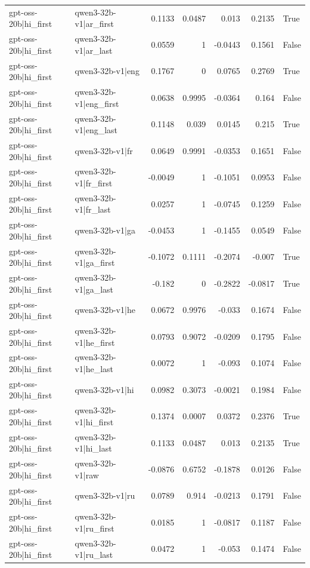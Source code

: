 \begin{table}
\begin{tabular}{l l r r r r l}
gpt-oss-20b|hi_first & qwen3-32b-v1|ar_first & 0.1133 & 0.0487 & 0.013 & 0.2135 & True \\
gpt-oss-20b|hi_first & qwen3-32b-v1|ar_last & 0.0559 & 1 & -0.0443 & 0.1561 & False \\
gpt-oss-20b|hi_first & qwen3-32b-v1|eng & 0.1767 & 0 & 0.0765 & 0.2769 & True \\
gpt-oss-20b|hi_first & qwen3-32b-v1|eng_first & 0.0638 & 0.9995 & -0.0364 & 0.164 & False \\
gpt-oss-20b|hi_first & qwen3-32b-v1|eng_last & 0.1148 & 0.039 & 0.0145 & 0.215 & True \\
gpt-oss-20b|hi_first & qwen3-32b-v1|fr & 0.0649 & 0.9991 & -0.0353 & 0.1651 & False \\
gpt-oss-20b|hi_first & qwen3-32b-v1|fr_first & -0.0049 & 1 & -0.1051 & 0.0953 & False \\
gpt-oss-20b|hi_first & qwen3-32b-v1|fr_last & 0.0257 & 1 & -0.0745 & 0.1259 & False \\
gpt-oss-20b|hi_first & qwen3-32b-v1|ga & -0.0453 & 1 & -0.1455 & 0.0549 & False \\
gpt-oss-20b|hi_first & qwen3-32b-v1|ga_first & -0.1072 & 0.1111 & -0.2074 & -0.007 & True \\
gpt-oss-20b|hi_first & qwen3-32b-v1|ga_last & -0.182 & 0 & -0.2822 & -0.0817 & True \\
gpt-oss-20b|hi_first & qwen3-32b-v1|he & 0.0672 & 0.9976 & -0.033 & 0.1674 & False \\
gpt-oss-20b|hi_first & qwen3-32b-v1|he_first & 0.0793 & 0.9072 & -0.0209 & 0.1795 & False \\
gpt-oss-20b|hi_first & qwen3-32b-v1|he_last & 0.0072 & 1 & -0.093 & 0.1074 & False \\
gpt-oss-20b|hi_first & qwen3-32b-v1|hi & 0.0982 & 0.3073 & -0.0021 & 0.1984 & False \\
gpt-oss-20b|hi_first & qwen3-32b-v1|hi_first & 0.1374 & 0.0007 & 0.0372 & 0.2376 & True \\
gpt-oss-20b|hi_first & qwen3-32b-v1|hi_last & 0.1133 & 0.0487 & 0.013 & 0.2135 & True \\
gpt-oss-20b|hi_first & qwen3-32b-v1|raw & -0.0876 & 0.6752 & -0.1878 & 0.0126 & False \\
gpt-oss-20b|hi_first & qwen3-32b-v1|ru & 0.0789 & 0.914 & -0.0213 & 0.1791 & False \\
gpt-oss-20b|hi_first & qwen3-32b-v1|ru_first & 0.0185 & 1 & -0.0817 & 0.1187 & False \\
gpt-oss-20b|hi_first & qwen3-32b-v1|ru_last & 0.0472 & 1 & -0.053 & 0.1474 & False \\

\end{tabular}
\end{table}

